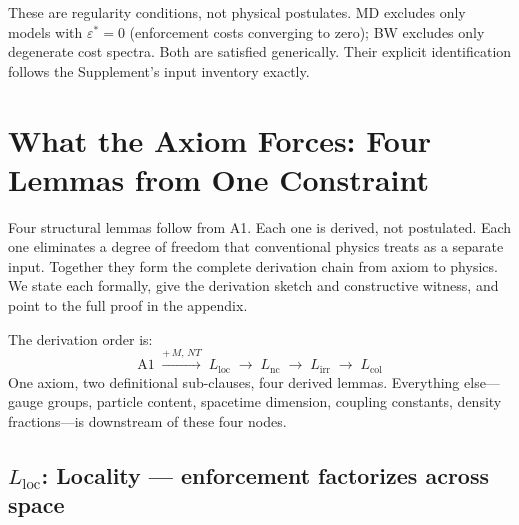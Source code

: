 \documentclass[11pt]{article}
\begin{document}
These are regularity conditions, not physical postulates.  MD excludes only models with $\varepsilon^* = 0$ (enforcement costs converging to zero); BW excludes only degenerate cost spectra.  Both are satisfied generically.  Their explicit identification follows the Supplement's input inventory exactly.


\section{What the Axiom Forces: Four Lemmas from One Constraint}

Four structural lemmas follow from A1.  Each one is derived, not postulated.  Each one eliminates a degree of freedom that conventional physics treats as a separate input.  Together they form the complete derivation chain from axiom to physics.  We state each formally, give the derivation sketch and constructive witness, and point to the full proof in the appendix.

The derivation order is:
\begin{equation}
\text{A1} \;\xrightarrow{+\,M,\,NT}\; L_{\mathrm{loc}} \;\longrightarrow\; L_{\mathrm{nc}} \;\longrightarrow\; L_{\mathrm{irr}} \;\longrightarrow\; L_{\mathrm{col}}
\end{equation}
One axiom, two definitional sub-clauses, four derived lemmas.  Everything else---gauge groups, particle content, spacetime dimension, coupling constants, density fractions---is downstream of these four nodes.

\subsection{\texorpdfstring{$L_{\mathrm{loc}}$}{Lloc}: Locality --- enforcement factorizes across space}
\end{document}
